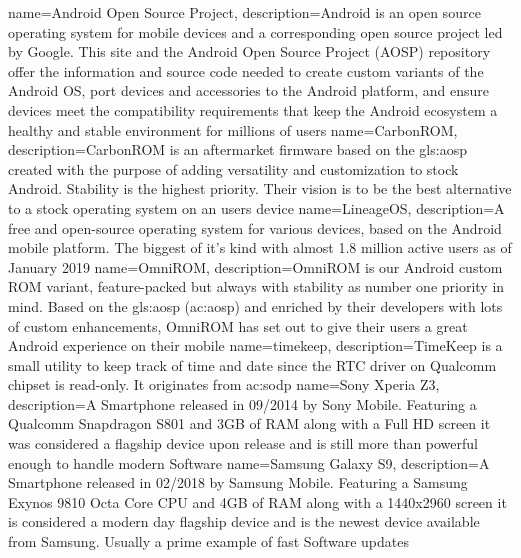 { name=Android Open Source Project,
	description={Android is an open source operating system for mobile devices and a corresponding open source project led by Google. This site and the Android Open Source Project (AOSP) repository offer the information and source code needed to create custom variants of the Android OS, port devices and accessories to the Android platform, and ensure devices meet the compatibility requirements that keep the Android ecosystem a healthy and stable environment for millions of users \citep{web:aosp}}}
{ name=CarbonROM,
	description={CarbonROM is an aftermarket firmware based on the \gls{gls:aosp} created with the purpose of adding versatility and customization to stock Android. Stability is the highest priority. Their vision is to be the best alternative to a stock operating system on an users device \citep{web:carbon}}}
{ name=LineageOS,
	description={A free and open-source operating system for various devices, based on the Android mobile platform. The biggest of it's kind with almost 1.8 million active users as of January 2019 \citep{web:lineage}}}
{ name=OmniROM,
	description={OmniROM is our Android custom ROM variant, feature-packed but always with stability as number one priority in mind.
Based on the \gls{gls:aosp} (\acrshort{ac:aosp}) and enriched by their developers with lots of custom enhancements, OmniROM has set out to give their users a great Android experience on their mobile \citep{web:omnirom}}}
{ name=timekeep,
	description={TimeKeep is a small utility to keep track of time and date since the RTC driver on Qualcomm chipset is read-only. It originates from \acrshort{ac:sodp} \citep{web:sodp}}}
{ name=Sony Xperia Z3,
	description={A Smartphone released in 09/2014 by Sony Mobile.
	Featuring a Qualcomm Snapdragon S801 and 3GB of RAM along with a Full HD screen it was considered a flagship device upon release and is still more than powerful enough to handle modern Software \citep{web:z3}}}
{ name=Samsung Galaxy S9,
	description={A Smartphone released in 02/2018 by Samsung Mobile.
	Featuring a Samsung Exynos 9810 Octa Core CPU and 4GB of RAM along with a 1440x2960 screen it is considered a modern day flagship device and is the newest device available from Samsung. Usually a prime example of fast Software updates \citep{web:s9}}}
